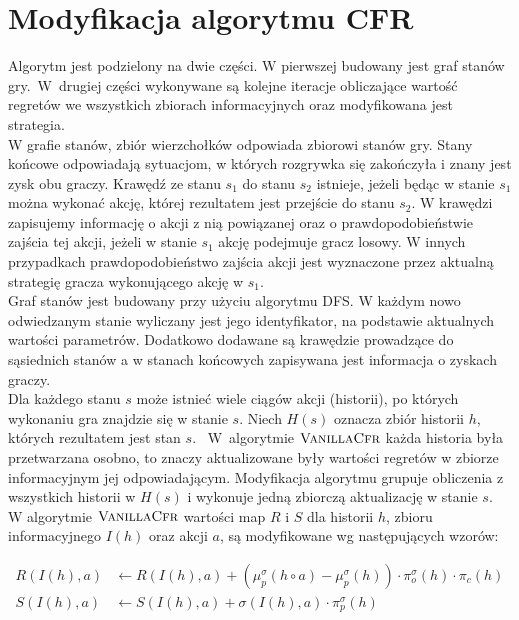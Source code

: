 \documentclass[magisterska]{pracamgr}
\begin{document}
\section{Modyfikacja algorytmu CFR}

\noindent
Algorytm jest podzielony na dwie części. W pierwszej budowany jest graf stanów gry.~W~drugiej części
wykonywane są kolejne iteracje obliczające wartość regretów we wszystkich zbiorach informacyjnych oraz
modyfikowana jest strategia. \\

\noindent
W grafie stanów, zbiór wierzchołków odpowiada zbiorowi stanów gry. Stany końcowe odpowiadają
sytuacjom, w których rozgrywka się zakończyła i znany jest zysk obu graczy. Krawędź ze stanu $s_1$ do stanu $s_2$
istnieje, jeżeli będąc w stanie $s_1$ można wykonać akcję, której rezultatem jest przejście do stanu
$s_2$. W krawędzi zapisujemy informację o akcji z nią powiązanej oraz o prawdopodobieństwie zajścia
tej akcji, jeżeli w stanie $s_1$ akcję podejmuje gracz losowy. W innych przypadkach prawdopodobieństwo
zajścia akcji jest wyznaczone przez aktualną strategię gracza wykonującego akcję w $s_1$. \\

\noindent
Graf stanów jest budowany przy użyciu algorytmu DFS. W każdym nowo odwiedzanym stanie
wyliczany jest jego identyfikator, na podstawie aktualnych wartości parametrów. Dodatkowo dodawane
są krawędzie prowadzące do sąsiednich stanów a w stanach końcowych zapisywana jest informacja o
zyskach graczy. \\

\noindent
Dla każdego stanu $s$ może istnieć wiele ciągów akcji (historii), po których wykonaniu gra
znajdzie się w stanie $s$. Niech $H(s)$ oznacza zbiór historii $h$, których rezultatem jest stan $s$.
~W~algorytmie $\Call{VanillaCfr}{}$ każda historia była przetwarzana osobno, to znaczy aktualizowane były wartości
regretów w zbiorze informacyjnym jej odpowiadającym. Modyfikacja algorytmu grupuje obliczenia z
wszystkich historii w $H(s)$ i wykonuje jedną zbiorczą aktualizację w stanie $s$. \\

\noindent
W algorytmie $\Call{VanillaCfr}{}$ wartości map $R$ i $S$ dla historii $h$, zbioru informacyjnego $I(h)$ oraz akcji $a$, są modyfikowane
wg następujących wzorów:

\begin{align*}
R(I(h), a) &\leftarrow R(I(h), a) + (\mu_p^{\sigma}(h \circ a) - \mu_p^{\sigma}(h)) \cdot \pi_{o}^{\sigma}(h) \cdot \pi_c(h) \\
S(I(h), a) &\leftarrow S(I(h), a) + \sigma(I(h), a) \cdot \pi_p^{\sigma}(h)
\end{align*}
\end{document}
